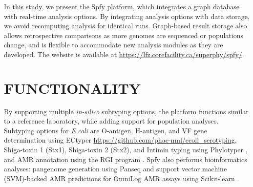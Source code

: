 \documentclass{article}
\begin{document}
In this study, we present the Spfy platform, which integrates a graph database with real-time analysis options. By integrating analysis options with data storage, we avoid recomputing analysis for identical runs. Graph-based result storage also allows retrospective comparisons as more genomes are sequenced or populations change, and is flexible to accommodate new analysis modules as they are developed. The website is available at \url{https://lfz.corefacility.ca/superphy/spfy/}.



\enlargethispage{-65.1pt}



\section{FUNCTIONALITY}

By supporting multiple \textit{in-silico} subtyping options, the platform functions similar to a reference laboratory, while adding support for population analyses. Subtyping options for \textit{E.coli} are O-antigen, H-antigen, and VF gene determination using ECtyper \url{https://github.com/phac-nml/ecoli\_serotyping}, Shiga-toxin 1 (Stx1), Shiga-toxin 2 (Stx2), and Intimin typing using Phylotyper \cite{whiteside2017phylotyper}, and AMR annotation using the RGI program \cite{mcarthur2013comprehensive}.
Spfy also performs bioinformatics analyses: pangenome generation using Panseq \cite{laing2010pan} and support vector machine (SVM)-backed AMR predictions for OmniLog AMR assays using Scikit-learn \cite{pedregosa2011scikit}.
\end{document}
